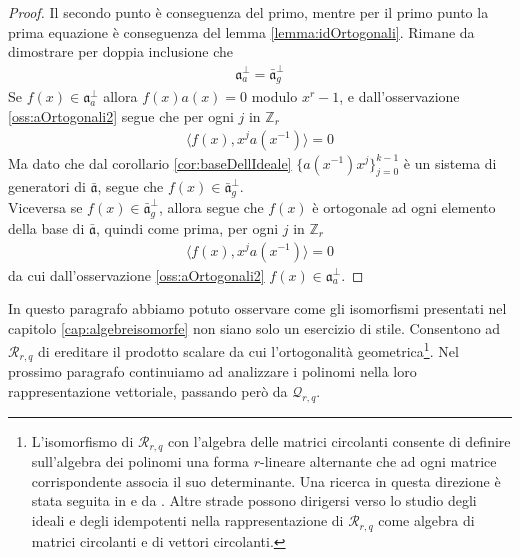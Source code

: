 \begin{proof}
   Il secondo punto è conseguenza del primo, mentre per il primo punto la prima equazione è conseguenza del lemma \ref{lemma:idOrtogonali}.
   Rimane da dimostrare per doppia inclusione che 
   \begin{align*}
        \mathfrak{a}_{a}^{\perp} = \bar{\mathfrak{a}}_{g}^{\perp}
    \end{align*}
    Se $f(x) \in \mathfrak{a}_{a}^{\perp}$ allora $f(x)a(x) = 0$ modulo $x^r - 1$, e dall'osservazione \ref{oss:aOrtogonali2} segue che per ogni $j$ in $\mathbb{Z}_{r}$
    \begin{align*}
       \langle f(x), x^{j}a(x^{-1}) \rangle = 0
    \end{align*}
    Ma dato che dal corollario \ref{cor:baseDellIdeale} $\lbrace a(x^{-1})x^{j} \rbrace_{j=0}^{k-1}$ è un sistema di generatori di  $\bar{\mathfrak{a}}$, segue che $f(x) \in \bar{\mathfrak{a}}_{g}^{\perp}$. \\
    Viceversa se $f(x) \in \bar{\mathfrak{a}}_{g}^{\perp}$, allora segue che $f(x)$ è ortogonale ad ogni elemento della base di $\bar{\mathfrak{a}}$, quindi come prima, per ogni $j$ in $\mathbb{Z}_{r}$
    \begin{align*}
       \langle f(x), x^{j}a(x^{-1}) \rangle = 0
    \end{align*}
    da cui dall'osservazione \ref{oss:aOrtogonali2} $f(x) \in \mathfrak{a}_{a}^{\perp}$.
\end{proof}



In questo paragrafo abbiamo potuto osservare come gli isomorfismi presentati nel capitolo \ref{cap:algebreisomorfe} non siano solo un esercizio di stile. Consentono ad $\mathcal{R}_{r,q}$ di ereditare il prodotto scalare da cui l'ortogonalità geometrica\footnote{L'isomorfismo di $\mathcal{R}_{r,q}$ con l'algebra delle matrici circolanti consente di definire sull'algebra dei polinomi una forma $r$-lineare alternante che ad ogni matrice corrispondente associa il suo determinante. Una ricerca in questa direzione è stata seguita in \cite{montabone} e da \cite{wynjones}. Altre strade possono dirigersi verso lo studio degli ideali e degli idempotenti nella rappresentazione di $\mathcal{R}_{r,q}$ come algebra di matrici circolanti e di vettori circolanti.}. Nel prossimo paragrafo continuiamo ad analizzare i polinomi nella loro rappresentazione vettoriale, passando però da $\mathcal{Q}_{r,q}$.


